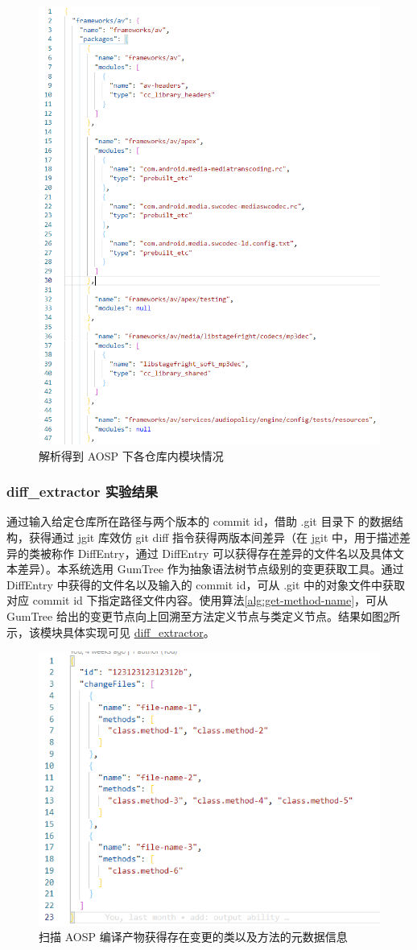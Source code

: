 \begin{figure}
    \centering
    \includegraphics[width=.4\textwidth]{figures/design-repo-pkg-relation.png}
    \caption{解析得到 AOSP 下各仓库内模块情况}
    \label{fig:design-repo-pkg-relation}
\end{figure}

\subsubsection{diff\_extractor 实验结果}

通过输入给定仓库所在路径与两个版本的 commit id，借助 .git 目录下 的数据结构，获得通过 jgit 库效仿 git diff 指令获得两版本间差异（在 jgit 中，用于描述差异的类被称作 DiffEntry，通过 DiffEntry 可以获得存在差异的文件名以及具体文本差异）。本系统选用 GumTree 作为抽象语法树节点级别的变更获取工具。通过 DiffEntry 中获得的文件名以及输入的 commit id，可从 .git 中的对象文件中获取对应 commit id 下指定路径文件内容。使用算法\ref{alg:get-method-name}，可从 GumTree 给出的变更节点向上回溯至方法定义节点与类定义节点。结果如图\ref{fig:design-diff-extractor}所示，该模块具体实现可见 \href{https://github.com/AOSPworking/diff_extractor}{diff\_extractor}。

\begin{figure}
    \centering
    \includegraphics[width=.4\textwidth]{figures/design-diff-extract.png}
    \caption{扫描 AOSP 编译产物获得存在变更的类以及方法的元数据信息}
    \label{fig:design-diff-extractor}
\end{figure}

